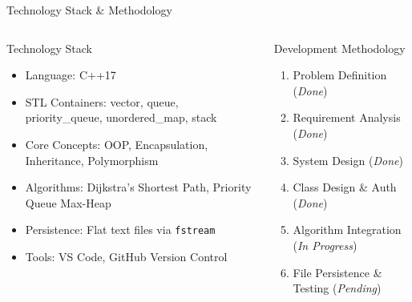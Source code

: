 \documentclass[aspectratio=169,11pt]{beamer}
\begin{document}
\begin{frame}{Technology Stack \& Methodology}

\footnotesize
\vspace{-3mm}

\begin{columns}[T,totalwidth=\textwidth]

\begin{block}{Technology Stack}
\tiny
\begin{itemize}\itemsep0.5pt
\item Language: C++17
\item STL Containers: vector, queue, priority\_queue, unordered\_map, stack
\item Core Concepts: OOP, Encapsulation, Inheritance, Polymorphism
\item Algorithms: Dijkstra's Shortest Path, Priority Queue Max-Heap
\item Persistence: Flat text files via \texttt{fstream}
\item Tools: VS Code, GitHub Version Control
\end{itemize}
\end{block}

\begin{block}{Development Methodology}
\tiny
\begin{enumerate}\itemsep0.5pt
\item Problem Definition (\textit{Done})
\item Requirement Analysis (\textit{Done})
\item System Design (\textit{Done})
\item Class Design \& Auth (\textit{Done})
\item Algorithm Integration (\textit{In Progress})
\item File Persistence \& Testing (\textit{Pending})
\end{enumerate}
\end{block}

\end{columns}

\end{frame}
\end{document}
